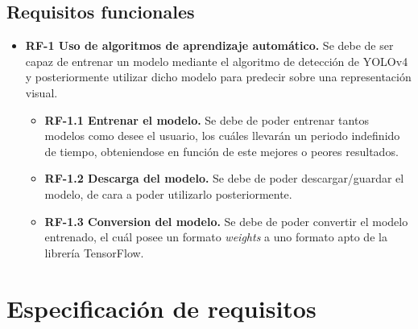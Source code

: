 \subsection{Requisitos funcionales}
\begin{itemize}
    \tightlist
    \item
      \textbf{RF-1 Uso de algoritmos de aprendizaje automático.} Se debe de ser capaz de entrenar un modelo mediante el algoritmo de detección de YOLOv4 y posteriormente utilizar dicho modelo para predecir sobre una representación visual.
    
    \begin{itemize}
    \tightlist
    \item \textbf{RF-1.1 Entrenar el modelo.} Se debe de poder entrenar tantos modelos como desee el usuario, los cuáles llevarán un periodo indefinido de tiempo, obteniendose en función de este mejores o peores resultados.
    \item \textbf{RF-1.2 Descarga del modelo.} Se debe de poder descargar/guardar el modelo, de cara a poder utilizarlo posteriormente.
    \item \textbf{RF-1.3 Conversion del modelo.} Se debe de poder convertir el modelo entrenado, el cuál posee un formato \textit{weights} a uno formato apto de la librería TensorFlow.
    \end{itemize}
\end{itemize}

\section{Especificación de requisitos}


